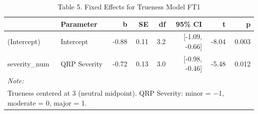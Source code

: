 \documentclass[
]{article}
\begin{document}
\begin{longtable}[t]{llrrrrrr}
\caption{\label{tab:unnamed-chunk-19}Table 5. Fixed Effects for Trueness Model FT1}\\
\toprule
 & Parameter & b & SE & df & 95\% CI & t & p\\
\midrule
(Intercept) & Intercept & -0.88 & 0.11 & 3.2 & {}[-1.09, -0.66] & -8.04 & 0.003\\
severity\_num & QRP Severity & -0.72 & 0.13 & 3.0 & {}[-0.98, -0.46] & -5.48 & 0.012\\
\bottomrule
\multicolumn{8}{l}{\rule{0pt}{1em}\textit{Note: }}\\
\multicolumn{8}{l}{\rule{0pt}{1em}Trueness centered at 3 (neutral midpoint). QRP Severity: minor = −1, moderate = 0, major = 1.}\\
\end{longtable}
\end{document}
